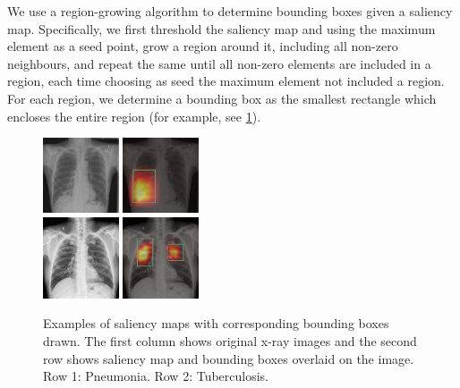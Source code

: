 \documentclass[oneside,a4paper]{article}
\begin{document}
We use a region-growing algorithm to determine bounding boxes given a saliency
map. Specifically, we first threshold the saliency map and using the maximum
element as a seed point, grow a region around it, including all non-zero
neighbours, and repeat the same until all non-zero elements are included in a
region, each time choosing as seed the maximum element not included a region.
For each region, we determine a bounding box as the smallest rectangle which
encloses the entire region (for example, see \ref{cam_bbox_examples}).

\begin{figure}
  \centering
  \includegraphics[width=0.2\textwidth]{images/preds/pneumonia}\hspace{0.01\textwidth}%
  \includegraphics[width=0.2\textwidth]{images/preds/pneumonia_cam}\\[0.01\textwidth]
  \includegraphics[width=0.2\textwidth]{images/preds/TB2}\hspace{0.01\textwidth}%
  \includegraphics[width=0.2\textwidth]{images/preds/TB2_cam}\\[0.01\textwidth]
  \caption{Examples of saliency maps with corresponding bounding boxes drawn.
    The first column shows original x-ray images and the second row shows
    saliency map and bounding boxes overlaid on the image. Row 1: Pneumonia. Row
    2: Tuberculosis.}
  \label{cam_bbox_examples}
\end{figure}
\end{document}
